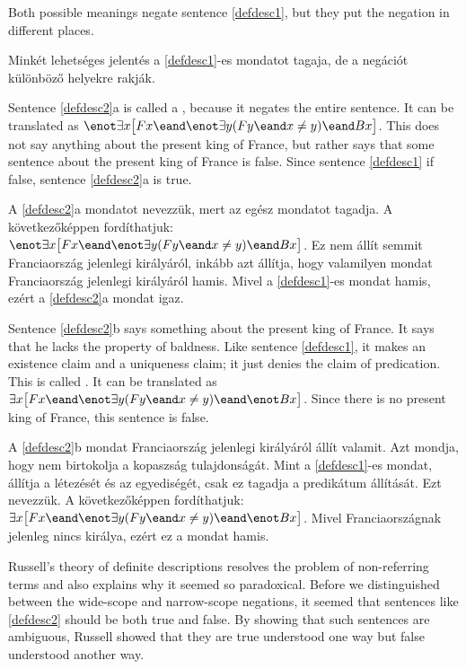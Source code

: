 Both possible meanings negate sentence \ref{defdesc1}, but they put the negation in different places.

Minkét lehetséges jelentés a \ref{defdesc1}-es mondatot tagaja, de a negációt különböző helyekre rakják.

Sentence \ref{defdesc2}a is called a , because it negates the entire sentence. It can be translated as $\enot\exists x\bigl[Fx \eand \enot\exists y(Fy \eand x\neq y) \eand Bx\bigr]$. This does not say anything about the present king of France, but rather says that some sentence about the present king of France is false. Since sentence \ref{defdesc1} if false, sentence \ref{defdesc2}a is true.

A \ref{defdesc2}a mondatot  nevezzük, mert az egész mondatot tagadja. A következőképpen fordíthatjuk: $\enot\exists x\bigl[Fx \eand \enot\exists y(Fy \eand x\neq y) \eand Bx\bigr]$. Ez nem állít semmit Franciaország jelenlegi királyáról, inkább azt állítja, hogy valamilyen mondat Franciaország jelenlegi királyáról hamis. Mivel a \ref{defdesc1}-es mondat hamis, ezért a \ref{defdesc2}a mondat igaz.

Sentence \ref{defdesc2}b says something about the present king of France. It says that he lacks the property of baldness. Like sentence \ref{defdesc1}, it makes an existence claim and a uniqueness claim; it just denies the claim of predication. This is called . It can be translated as $\exists x\bigl[Fx \eand \enot\exists y(Fy \eand x\neq y) \eand \enot Bx\bigr]$. Since there is no present king of France, this sentence is false.

A \ref{defdesc2}b mondat Franciaország jelenlegi királyáról állít valamit. Azt mondja, hogy nem birtokolja a kopaszság tulajdonságát. Mint a \ref{defdesc1}-es mondat, állítja a létezését és az egyediségét, csak ez tagadja a predikátum állítását. Ezt  nevezzük. A következőképpen fordíthatjuk: $\exists x\bigl[Fx \eand \enot\exists y(Fy \eand x\neq y) \eand \enot Bx\bigr]$. Mivel Franciaországnak jelenleg nincs királya, ezért ez a mondat hamis.

Russell's theory of definite descriptions resolves the problem of non-referring terms and also explains why it seemed so paradoxical. Before we distinguished between the wide-scope and narrow-scope negations, it seemed that sentences like \ref{defdesc2} should be both true and false. By showing that such sentences are ambiguous, Russell showed that they are true understood one way but false understood another way.

